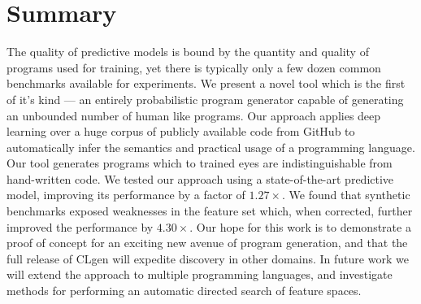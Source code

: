 \section{Summary}%
\label{sec:clgen-conclusion}

The quality of predictive models is bound by the quantity and quality of programs used for training, yet there is typically only a few dozen common benchmarks available for experiments. We present a novel tool which is the first of it's kind --- an entirely probabilistic program generator capable of generating an unbounded number of human like programs. Our approach applies deep learning over a huge corpus of publicly available code from GitHub to automatically infer the semantics and practical usage of a programming language. Our tool generates programs which to trained eyes are indistinguishable from hand-written code. We tested our approach using a state-of-the-art predictive model, improving its performance by a factor of $1.27\times$. We found that synthetic benchmarks exposed weaknesses in the feature set which, when corrected, further improved the performance by $4.30\times$. Our hope for this work is to demonstrate a proof of concept for an exciting new avenue of program generation, and that the full release of CLgen will expedite discovery in other domains. In future work we will extend the approach to multiple programming languages, and investigate methods for performing an automatic directed search of feature spaces.
